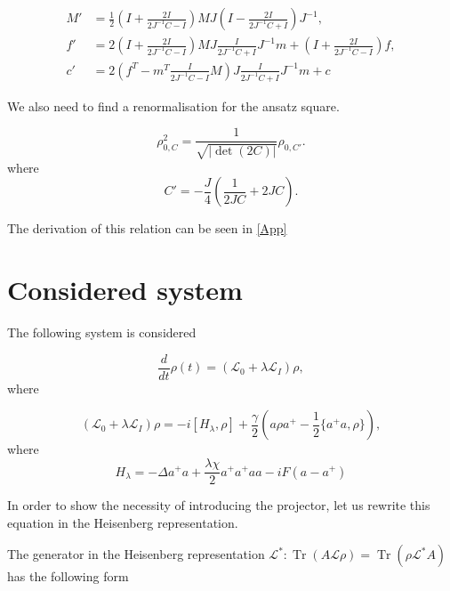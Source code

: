 \documentclass[12pt]{article}
\theoremstyle{definition}
\newcommand\Tr{\operatorname{Tr}}
\def\DE {\Delta}
\def\ga {\gamma}
\def\la {\lambda}
\begin{document}
	\begin{align}
		\label{eq:mfcdot}
		M' &= \frac{1}{2}\left(I + \frac{2I}{2J^{-1}C - I}\right)MJ\left(I - \frac{2I}{2J^{-1}C + I}\right)J^{-1}, \nonumber\\
		f' &= 2\left(I + \frac{2I}{2J^{-1}C - I}\right)MJ\frac{I}{2J^{-1}C + I}J^{-1}m + \left(I + \frac{2I}{2J^{-1}C - I}\right)f, \\
		c' &= 2\left(f^T - m^T\frac{I}{2J^{-1}C - I}M\right)J\frac{I}{2J^{-1}C + I}J^{-1}m + c
	\end{align}
	
	We also need to find a renormalisation for the ansatz square. 
	
	\begin{equation}
		\label{eq:RhoSq}
		\rho_{0,C}^2 = \frac{1}{\sqrt{|\det(2 C)|}} \rho_{0,C'}.
	\end{equation}
	where 
	\begin{equation*}
		C' = - \frac{J}{4}\left(\frac{1}{2 J C} + 2 J C\right).
	\end{equation*}
	
	The derivation of this relation can be seen in \ref{App}
	
	
	\section{\label{sec:ConsideredSystem} Considered system}
	
	The following system is considered
	
	\begin{equation}
		\label{eq:EvEq}
		\dfrac{d}{dt}\rho(t) = (\mathcal{L}_0 + \lambda\mathcal{L}_I)\rho,
	\end{equation}
	where
	
	\begin{equation}
		\label{eq:FormOfL}
		(\mathcal{L}_0 + \lambda\mathcal{L}_I)\rho = -i[H_{\lambda},\rho] + \dfrac{\ga}{2}(a\rho a^+ - \dfrac12\{a^+a,\rho\}),
	\end{equation}
	where
	\begin{equation}
		\label{eq:FormOfH}
		H_{\la} = -\DE a^+a + \dfrac{\la\chi}{2}a^+a^+aa - iF(a - a^+)
	\end{equation}
	
	In order to show the necessity of introducing the projector, let us rewrite this equation in the Heisenberg representation.
	
	The generator in the Heisenberg representation $\mathcal{L}^*: \Tr(A\mathcal{L}\rho) = \Tr(\rho\mathcal{L}^*A)$ has the following form
	
\end{document}
